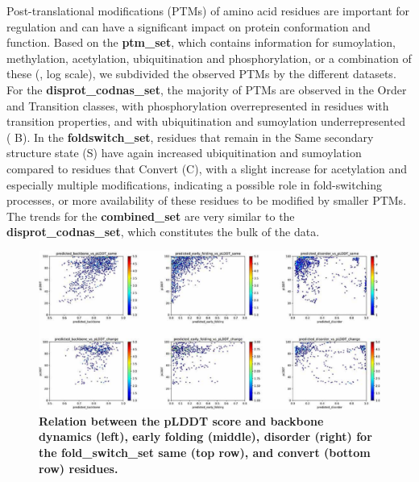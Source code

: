 Post-translational modifications (PTMs) of amino acid residues are important for regulation and can have a significant impact on protein conformation and function. Based on the \textbf{ptm_set}, which contains information for sumoylation, methylation, acetylation, ubiquitination and phosphorylation, or a combination of these (, log scale), we subdivided the observed PTMs by the different datasets. For the \textbf{disprot_codnas_set}, the majority of PTMs are observed in the Order and Transition classes, with phosphorylation overrepresented in residues with transition properties, and with ubiquitination and sumoylation underrepresented ( B). In the \textbf{foldswitch_set}, residues that remain in the Same secondary structure state (S) have again increased ubiquitination and sumoylation compared to residues that Convert (C), with a slight increase for acetylation and especially multiple modifications, indicating a possible role in fold-switching processes, or more availability of these residues to be modified by smaller PTMs. The trends for the \textbf{combined_set} are very similar to the \textbf{disprot_codnas_set}, which constitutes the bulk of the data.

\begin{figure}[tbh]
    \centering
    \includegraphics[width=\linewidth]{ambiguous//figures_ambiguous/fig7.pdf}
    \caption{\textbf{Relation between the pLDDT score and backbone dynamics (left), early folding (middle), disorder (right) for the fold_switch_set same (top row), and convert (bottom row) residues.}}
    \label{fig:chapter5:fig7}
\end{figure}

